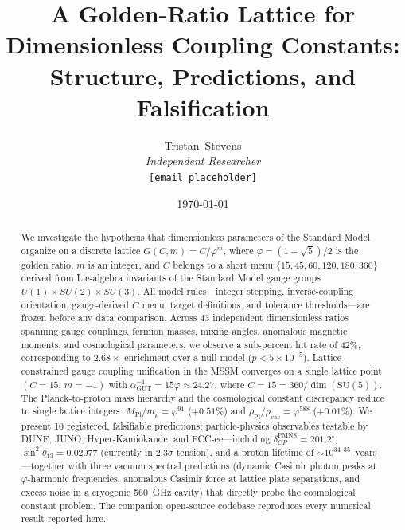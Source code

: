 \documentclass[12pt,a4paper]{article}
\title{A Golden-Ratio Lattice for Dimensionless Coupling Constants:\\
Structure, Predictions, and Falsification}
\author{Tristan~Stevens\\[4pt]
\textit{Independent Researcher}\\
\texttt{[email placeholder]}}
\date{\today}
\newcommand{\vp}{\varphi}
\newcommand{\aGUT}{\alpha_{\mathrm{GUT}}}
\newcommand{\MPl}{M_{\mathrm{Pl}}}
\begin{document}
\maketitle

\begin{abstract}
We investigate the hypothesis that dimensionless parameters of the Standard
Model organize on a discrete lattice $G(C,m) = C/\vp^m$, where
$\vp = (1+\sqrt{5})/2$ is the golden ratio, $m$ is an integer, and $C$
belongs to a short menu $\{15, 45, 60, 120, 180, 360\}$ derived from
Lie-algebra invariants of the Standard Model gauge groups
$U(1)\times SU(2)\times SU(3)$.  All model rules---integer stepping,
inverse-coupling orientation, gauge-derived $C$ menu, target definitions, and
tolerance thresholds---are frozen before any data comparison.  Across 43
independent dimensionless ratios spanning gauge couplings, fermion masses,
mixing angles, anomalous magnetic moments, and cosmological parameters, we
observe a sub-percent hit rate of 42\%, corresponding to $2.68\times$
enrichment over a null model ($p < 5\times 10^{-5}$).  Lattice-constrained
gauge coupling unification in the MSSM converges on a single lattice point
$(C=15,\,m=-1)$ with $\aGUT^{-1} = 15\vp \approx 24.27$, where $C=15 =
360/\dim(\mathrm{SU}(5))$.  The Planck-to-proton mass hierarchy and the
cosmological constant discrepancy reduce to single lattice integers:
$\MPl/m_p = \vp^{91}$ ($+0.51\%$) and $\rho_{\mathrm{Pl}}/\rho_{\mathrm{vac}}
= \vp^{588}$ ($+0.01\%$).  We present 10 registered, falsifiable predictions:
particle-physics observables testable by DUNE, JUNO, Hyper-Kamiokande, and
FCC-ee---including $\delta_{CP}^{\mathrm{PMNS}} = 201.2^\circ$,
$\sin^2\theta_{13} = 0.02077$ (currently in $2.3\sigma$ tension), and a proton
lifetime of $\sim\!10^{34\text{--}35}$~years---together with three vacuum
spectral predictions (dynamic Casimir photon peaks at $\vp$-harmonic
frequencies, anomalous Casimir force at lattice plate separations, and excess
noise in a cryogenic 560~GHz cavity) that directly probe the cosmological
constant problem.  The companion open-source codebase reproduces every
numerical result reported here.
\end{abstract}

\tableofcontents
\newpage

\end{document}
